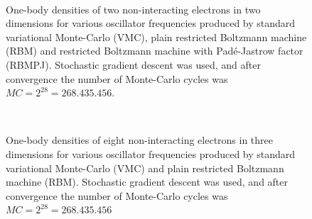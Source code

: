 \begin{figure} [H]%
	\centering
	\\
	
	\caption{One-body densities of two non-interacting electrons in two dimensions for various oscillator frequencies produced by standard variational Monte-Carlo (VMC), plain restricted Boltzmann machine (RBM) and restricted Boltzmann machine with Padé-Jastrow factor (RBMPJ). Stochastic gradient descent was used, and after convergence the number of Monte-Carlo cycles was $MC=2^{28}=268.435.456$.}%
	\label{fig:OB_interaction_2P_3D}
\end{figure}

\begin{figure} [H]%
	\centering
	\\
	
	\caption{One-body densities of eight non-interacting electrons in three dimensions for various oscillator frequencies produced by standard variational Monte-Carlo (VMC) and plain restricted Boltzmann machine (RBM). Stochastic gradient descent was used, and after convergence the number of Monte-Carlo cycles was $MC=2^{28}=268.435.456$}%
	\label{fig:OB_interaction_8P_3D}
\end{figure}